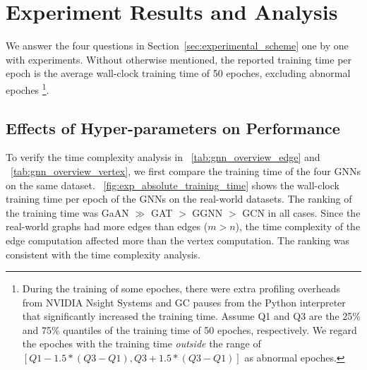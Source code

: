\section{Experiment Results and Analysis}
\label{sec:experiment_results}

We answer the four questions in Section~\ref{sec:experimental_scheme} one by one with experiments.
Without otherwise mentioned, the reported training time per epoch is the average wall-clock training time of 50 epoches, excluding abnormal epoches \footnote{During the training of some epoches, there were extra profiling overheads from NVIDIA Nsight Systems and GC pauses from the Python interpreter that significantly increased the training time. Assume Q1 and Q3 are the 25\% and 75\% quantiles of the training time of 50 epoches, respectively. We regard the epoches with the training time \emph{outside} the range of $[Q1 - 1.5 * (Q3-Q1), Q3 + 1.5 * (Q3-Q1)]$ as abnormal epoches.}.

\subsection{Effects of Hyper-parameters on Performance}
\label{sec:effects_of_hyper-parameters_on_performance}

To verify the time complexity analysis in \tablename~\ref{tab:gnn_overview_edge} and \tablename~\ref{tab:gnn_overview_vertex}, we first compare the training time of the four GNNs on the same dataset.
\figurename~\ref{fig:exp_absolute_training_time} shows the wall-clock training time per epoch of the GNNs on the real-world datasets.
The ranking of the training time was GaAN $\gg$ GAT $>$ GGNN $>$ GCN in all cases.
Since the real-world graphs had more edges than edges ($m > n$), the time complexity of the edge computation affected more than the vertex computation.
The ranking was consistent with the time complexity analysis.


